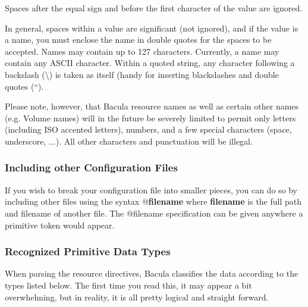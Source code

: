 Spaces after the equal sign and before the first character of the value are
ignored. 

In general, spaces within a value are significant (not ignored), and if the
value is a name, you must enclose the name in double quotes for the spaces to
be accepted. Names may contain up to 127 characters. Currently, a name may
contain any ASCII character. Within a quoted string, any character following a
backslash (\textbackslash{}) is taken as itself (handy for inserting
blackslashes and double quotes (``). 

Please note, however, that Bacula resource names as well as certain other
names (e.g. Volume names) will in the future be severely limited to permit
only letters (including ISO accented letters), numbers, and a few special
characters (space, underscore, ...). All other characters and punctuation will
be illegal. 
\label{Includes}

\subsubsection*{Including other Configuration Files}

If you wish to break your configuration file into smaller pieces, you can do
so by including other files using the syntax @{\bf filename} where {\bf
filename} is the full path and filename of another file. The @filename
specification can be given anywhere a primitive token would appear. 
\label{DataTypes}

\subsubsection*{Recognized Primitive Data Types}

When parsing the resource directives, Bacula classifies the data according to
the types listed below. The first time you read this, it may appear a bit
overwhelming, but in reality, it is all pretty logical and straight forward. 

